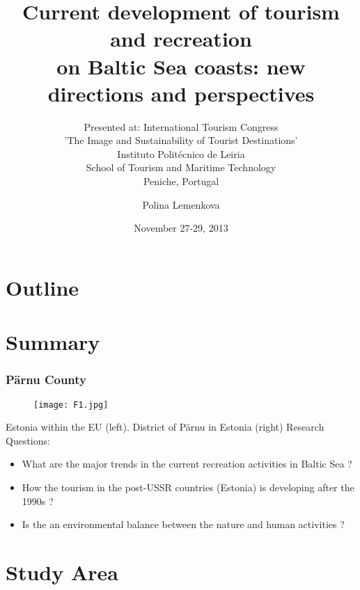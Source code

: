 \documentclass[pdflatex,compress,8pt,
	xcolor={dvipsnames,dvipsnames,svgnames,x11names,table},
]{beamer}
\title{Current development of tourism and recreation \\
on Baltic Sea coasts: new directions and perspectives}
\subtitle{Presented at: \nth{6} International Tourism Congress \\
'The Image and Sustainability of Tourist Destinations'\\
Instituto Polit\'{e}cnico de Leiria\\
School of Tourism and Maritime Technology\\
Peniche, Portugal}
\author{Polina Lemenkova}
\date{November 27-29, 2013}
\begin{document}
\begin{frame}
           \titlepage
\end{frame}

\section*{Outline}
\begin{frame}
	\tableofcontents
\end{frame}

\section{Summary}
\begin{frame}\frametitle{Pärnu County}
\begin{figure}[H]
	\centering
		\texttt{[image: F1.jpg]}
\end{figure}
\footnotesize{Estonia within the EU (left). District of Pärnu in Estonia (right)}
Research Questions:
\begin{itemize}
	\item What are the major trends in the current recreation activities in Baltic Sea ?
	\item How the tourism in the post-USSR countries (Estonia) is developing after the 1990s ?
	\item Is the an environmental balance between the nature and human activities ?
\end{itemize}
\end{frame} 

\section{Study Area}
\end{document}
